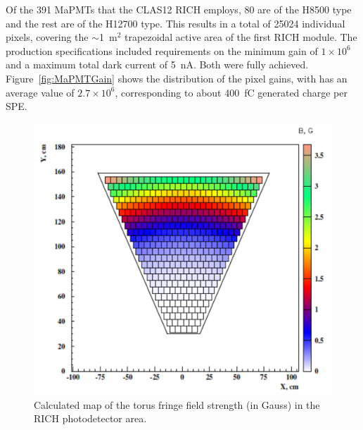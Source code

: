 \documentclass[5p,times,twocolumn]{elsarticle}
\begin{document}
Of the 391 MaPMTs that the CLAS12 RICH employs, 80 are of the H8500 type and the rest are of the H12700 type.
This results in a total of 25024 individual pixels, covering the $\sim$1~m$^2$ trapezoidal active area of the first
RICH module.
The production specifications included requirements on the minimum gain of $1 \times 10^6$ and a maximum total dark
current of 5~nA. Both were fully achieved. Figure~\ref{fig:MaPMTGain} shows the distribution of the pixel gains, with
has an average value of $2.7 \times 10^6$, corresponding to about 400~fC generated charge per SPE.

\begin{figure}[t]
\begin{center}
\includegraphics[width=0.85\columnwidth]{Field.pdf}
\end{center}
\caption{Calculated map of the torus fringe field strength (in Gauss) in the RICH photodetector area.}
\label{fig:MagFringe}
\end{figure}
\end{document}
